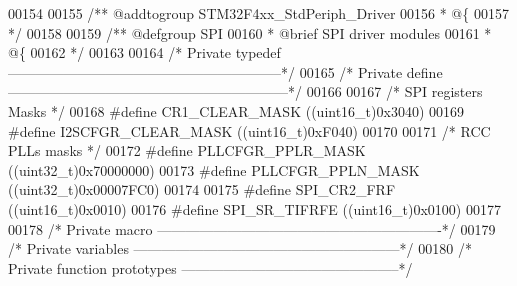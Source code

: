 \begin{DoxyCode}
00154 
00155 \textcolor{comment}{/** @addtogroup STM32F4xx\_StdPeriph\_Driver}
00156 \textcolor{comment}{  * @\{}
00157 \textcolor{comment}{  */}
00158 
00159 \textcolor{comment}{/** @defgroup SPI }
00160 \textcolor{comment}{  * @brief SPI driver modules}
00161 \textcolor{comment}{  * @\{}
00162 \textcolor{comment}{  */}
00163 
00164 \textcolor{comment}{/* Private typedef -----------------------------------------------------------*/}
00165 \textcolor{comment}{/* Private define ------------------------------------------------------------*/}
00166 
00167 \textcolor{comment}{/* SPI registers Masks */}
00168 \textcolor{preprocessor}{#}\textcolor{preprocessor}{define} \textcolor{preprocessor}{CR1\_CLEAR\_MASK}            \textcolor{preprocessor}{(}\textcolor{preprocessor}{(}\textcolor{preprocessor}{uint16\_t}\textcolor{preprocessor}{)}0x3040\textcolor{preprocessor}{)}
00169 \textcolor{preprocessor}{#}\textcolor{preprocessor}{define} \textcolor{preprocessor}{I2SCFGR\_CLEAR\_MASK}        \textcolor{preprocessor}{(}\textcolor{preprocessor}{(}\textcolor{preprocessor}{uint16\_t}\textcolor{preprocessor}{)}0xF040\textcolor{preprocessor}{)}
00170 
00171 \textcolor{comment}{/* RCC PLLs masks */}
00172 \textcolor{preprocessor}{#}\textcolor{preprocessor}{define} \textcolor{preprocessor}{PLLCFGR\_PPLR\_MASK}         \textcolor{preprocessor}{(}\textcolor{preprocessor}{(}\textcolor{preprocessor}{uint32\_t}\textcolor{preprocessor}{)}0x70000000\textcolor{preprocessor}{)}
00173 \textcolor{preprocessor}{#}\textcolor{preprocessor}{define} \textcolor{preprocessor}{PLLCFGR\_PPLN\_MASK}         \textcolor{preprocessor}{(}\textcolor{preprocessor}{(}\textcolor{preprocessor}{uint32\_t}\textcolor{preprocessor}{)}0x00007FC0\textcolor{preprocessor}{)}
00174 
00175 \textcolor{preprocessor}{#}\textcolor{preprocessor}{define} \textcolor{preprocessor}{SPI\_CR2\_FRF}               \textcolor{preprocessor}{(}\textcolor{preprocessor}{(}\textcolor{preprocessor}{uint16\_t}\textcolor{preprocessor}{)}0x0010\textcolor{preprocessor}{)}
00176 \textcolor{preprocessor}{#}\textcolor{preprocessor}{define} \textcolor{preprocessor}{SPI\_SR\_TIFRFE}             \textcolor{preprocessor}{(}\textcolor{preprocessor}{(}\textcolor{preprocessor}{uint16\_t}\textcolor{preprocessor}{)}0x0100\textcolor{preprocessor}{)}
00177 
00178 \textcolor{comment}{/* Private macro -------------------------------------------------------------*/}
00179 \textcolor{comment}{/* Private variables ---------------------------------------------------------*/}
00180 \textcolor{comment}{/* Private function prototypes -----------------------------------------------*/}

\end{DoxyCode}
